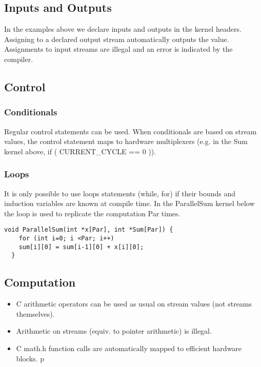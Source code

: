 \subsection{Inputs and Outputs}

In the examples above we declare inputs and outputs in the kernel
headers. Assigning to a declared output stream automatically outputs
the value. Assignments to input streams are illegal and an error is
indicated by the compiler.

\subsection{Control}

\subsubsection*{Conditionals}

Regular control statements can be used. When conditionals are based on
stream values, the control statement maps to hardware multiplexers
(e.g. in the Sum kernel above, if ( CURRENT\_CYCLE == 0 )).

\subsubsection*{Loops}

It is only possible to use loops statements (while, for) if their
bounds and induction variables are known at compile time. In the
ParallelSum kernel below the loop is used to replicate the computation
Par times.

\begin{lstlisting}[caption={Using loops for \FAST{} design parametrisation}]
  void ParallelSum(int *x[Par], int *Sum[Par]) {
    for (int i=0; i <Par; i++)
    sum[i][0] = sum[i-1][0] + x[i][0];
  }
\end{lstlisting}
\subsection{Computation}

\begin{itemize}

\item C arithmetic operators can be used as usual on stream values (not streams themselves).
\item Arithmetic on streams (equiv. to pointer arithmetic) is illegal.
\item C math.h function calls are automatically mapped to efficient hardware blocks.
  p
\end{itemize}

